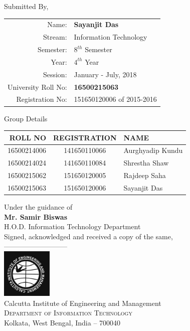 \documentclass[11pt, a4paper]{thesis}
\begin{document}
\begin{titlepage}
\begin{center}
Submitted By,\\
\begin{table}[h]
\centering
\begin{tabular}{| r | l |}
\hline
Name: & \textbf{Sayanjit Das}\\
Stream: & Information Technology\\ 
Semester: & $8^{th}$ Semester\\
Year: & $4^{th}$ Year\\
Session: & January - July, 2018\\
University Roll No: & \textbf{16500215063}\\
Registration No: & 151650120006 of 2015-2016\\ \hline
\end{tabular}
\end{table}
\normalsize Group Details\\
\begin{table}[h]
\centering
\begin{tabular}{ r  c  l }
\toprule
\textbf{ROLL NO} & \textbf{REGISTRATION} & \textbf{NAME} \\ \midrule
16500214006 & 141650110066 & Aurghyadip Kundu \\
16500214024 & 141650110084 & Shrestha Shaw \\
16500215062 & 151650120005 & Rajdeep Saha \\
16500215063 & 151650120006 & Sayanjit Das\\
\bottomrule
\end{tabular}
\end{table}
\vspace{.1in}
Under the guidance of\\
\textbf{Mr. Samir Biswas}\\
H.O.D. Information Technology Department\\
\vfill
Signed, acknowledged and received a copy of the same,\\
\vspace{0.5in}
---------------------------\\
\vfill
\includegraphics[width=0.18\textwidth]{ciem-logo.jpg}\\[0.1in]
\Large{Calcutta Institute of Engineering and Management}\\
\normalsize
\textsc{Department of Information Technology}\\
Kolkata, West Bengal, India -- 700040 \\
\vspace{0.2cm}

\end{center}

\end{titlepage}
\end{document}
